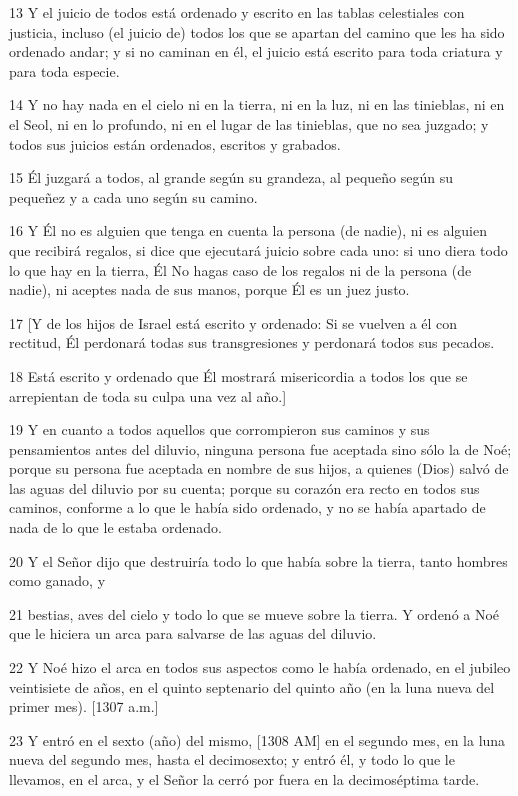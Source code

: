\par 13 Y el juicio de todos está ordenado y escrito en las tablas celestiales con justicia, incluso (el juicio de) todos los que se apartan del camino que les ha sido ordenado andar; y si no caminan en él, el juicio está escrito para toda criatura y para toda especie.
\par 14 Y no hay nada en el cielo ni en la tierra, ni en la luz, ni en las tinieblas, ni en el Seol, ni en lo profundo, ni en el lugar de las tinieblas, que no sea juzgado; y todos sus juicios están ordenados, escritos y grabados.
\par 15 Él juzgará a todos, al grande según su grandeza, al pequeño según su pequeñez y a cada uno según su camino.
\par 16 Y Él no es alguien que tenga en cuenta la persona (de nadie), ni es alguien que recibirá regalos, si dice que ejecutará juicio sobre cada uno: si uno diera todo lo que hay en la tierra, Él No hagas caso de los regalos ni de la persona (de nadie), ni aceptes nada de sus manos, porque Él es un juez justo.
\par 17 [Y de los hijos de Israel está escrito y ordenado: Si se vuelven a él con rectitud, Él perdonará todas sus transgresiones y perdonará todos sus pecados.
\par 18 Está escrito y ordenado que Él mostrará misericordia a todos los que se arrepientan de toda su culpa una vez al año.]
\par 19 Y en cuanto a todos aquellos que corrompieron sus caminos y sus pensamientos antes del diluvio, ninguna persona fue aceptada sino sólo la de Noé; porque su persona fue aceptada en nombre de sus hijos, a quienes (Dios) salvó de las aguas del diluvio por su cuenta; porque su corazón era recto en todos sus caminos, conforme a lo que le había sido ordenado, y no se había apartado de nada de lo que le estaba ordenado.
\par 20 Y el Señor dijo que destruiría todo lo que había sobre la tierra, tanto hombres como ganado, y
\par 21 bestias, aves del cielo y todo lo que se mueve sobre la tierra. Y ordenó a Noé que le hiciera un arca para salvarse de las aguas del diluvio.
\par 22 Y Noé hizo el arca en todos sus aspectos como le había ordenado, en el jubileo veintisiete de años, en el quinto septenario del quinto año (en la luna nueva del primer mes). [1307 a.m.]
\par 23 Y entró en el sexto (año) del mismo, [1308 AM] en el segundo mes, en la luna nueva del segundo mes, hasta el decimosexto; y entró él, y todo lo que le llevamos, en el arca, y el Señor la cerró por fuera en la decimoséptima tarde.
